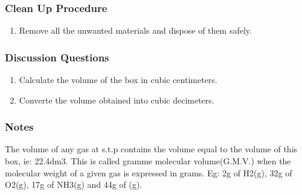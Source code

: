 \subsubsection*{Clean Up Procedure}
\begin{enumerate}
\item{Remove all the unwanted materials and dispose of them safely.}
\end{enumerate}

\subsubsection*{Discussion Questions}
\begin{enumerate}
\item{Calculate the volume of the box in cubic centimeters.}
\item{Converte the volume obtained into cubic decimeters.}
\end{enumerate}

\subsubsection*{Notes}
The volume of any gas at s.t.p contains the volume equal to the volume of this box, ie: 22.4dm3. This is called gramme molecular volume(G.M.V.) when the molecular weight of a given gas is expressed in grams. Eg: 2g of H2(g), 32g of O2(g), 17g of NH3(g) and 44g of (g).

